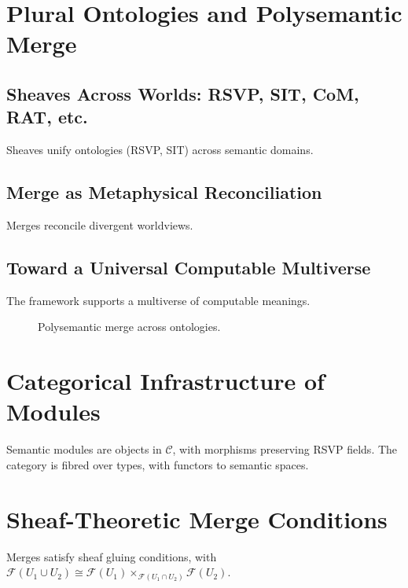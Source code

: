 \documentclass[12pt]{article}
\begin{document}
\section{Plural Ontologies and Polysemantic Merge}
\subsection{Sheaves Across Worlds: RSVP, SIT, CoM, RAT, etc.}
Sheaves unify ontologies (RSVP, SIT) across semantic domains.

\subsection{Merge as Metaphysical Reconciliation}
Merges reconcile divergent worldviews.

\subsection{Toward a Universal Computable Multiverse}
The framework supports a multiverse of computable meanings.

\begin{figure}[h]
    \centering
    \caption{Polysemantic merge across ontologies.}
\end{figure}

\appendix

\section{Categorical Infrastructure of Modules}
Semantic modules are objects in $\mathcal{C}$, with morphisms preserving RSVP fields. The category is fibred over types, with functors to semantic spaces.

\section{Sheaf-Theoretic Merge Conditions}
Merges satisfy sheaf gluing conditions, with $\mathcal{F}(U_1 \cup U_2) \cong \mathcal{F}(U_1) \times_{\mathcal{F}(U_1 \cap U_2)} \mathcal{F}(U_2)$.
\end{document}
